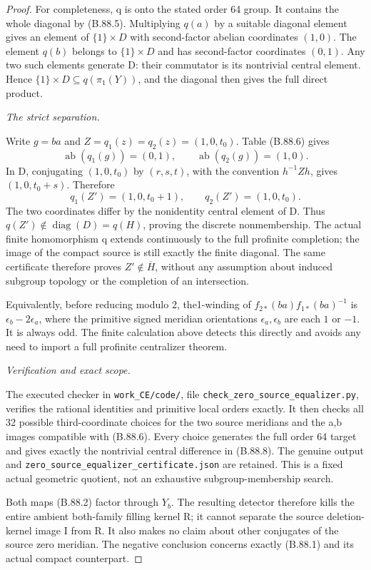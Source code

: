 \begin{proof}
For completeness, q is onto the stated order 64 group. It contains the
whole diagonal by (B.88.5). Multiplying \(q(a)\) by a suitable diagonal
element gives an element of \(\{1\}\times D\) with second-factor
abelian coordinates \((1,0)\). The element \(q(b)\) belongs to
\(\{1\}\times D\) and has second-factor coordinates \((0,1)\).
Any two such elements generate D: their commutator is its nontrivial
central element. Hence \(\{1\}\times D\subseteq q(\pi_1(Y))\),
and the diagonal then gives the full direct product.

\emph{The strict separation.}\par
Write \(g=ba\) and \(Z=q_1(z)=q_2(z)=(1,0,t_0)\).
Table (B.88.6) gives
\[
 \operatorname{ab}(q_1(g))=(0,1),\qquad
 \operatorname{ab}(q_2(g))=(1,0).
\tag{B.88.7}
\]
In D, conjugating \((1,0,t_0)\) by \((r,s,t)\), with the
convention \(h^{-1}Zh\), gives \((1,0,t_0+s)\).
Therefore
\[
 q_1(Z')=(1,0,t_0+1),\qquad
 q_2(Z')=(1,0,t_0).
\tag{B.88.8}
\]
The two coordinates differ by the nonidentity central element of D.
Thus \(q(Z')\notin\operatorname{diag}(D)=q(H)\), proving the
discrete nonmembership. The actual finite homomorphism q extends
continuously to the full profinite completion; the image of the compact
source is still exactly the finite diagonal. The same certificate
therefore proves \(Z'\notin\overline H\), without any assumption
about induced subgroup topology or the completion of an intersection.

Equivalently, before reducing modulo 2, the1-winding of
\(f_{2*}(ba)f_{1*}(ba)^{-1}\) is
\(\epsilon_b-2\epsilon_a\), where the primitive signed meridian
orientations \(\epsilon_a,\epsilon_b\) are each \(1\) or \(-1\).
It is always odd. The finite calculation above detects this directly
and avoids any need to import a full profinite centralizer theorem.

\emph{Verification and exact scope.}\par
The executed checker in \texttt{work\_\allowbreak CE/code/}, file
\texttt{check\_\allowbreak zero\_\allowbreak source\_\allowbreak equalizer.py},
verifies the rational identities and primitive local orders exactly.
It then checks all 32 possible third-coordinate choices for the two
source meridians and the a,b images compatible with (B.88.6).
Every choice generates the full order 64 target and gives exactly the
nontrivial central difference in (B.88.8). The genuine output and
\texttt{zero\_\allowbreak source\_\allowbreak equalizer\_\allowbreak certificate.json}
are retained. This is a fixed actual geometric quotient, not an
exhaustive subgroup-membership search.

Both maps (B.88.2) factor through \(Y_b\). The resulting detector
therefore kills the entire ambient both-family filling kernel R; it
cannot separate the source deletion-kernel image I from R. It also
makes no claim about other conjugates of the source zero meridian.
The negative conclusion concerns exactly (B.88.1) and its actual
compact counterpart.
\end{proof}
